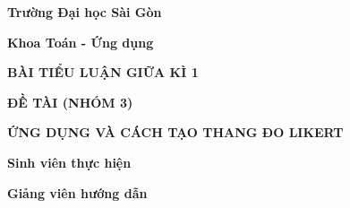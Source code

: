 \documentclass[12pt]{article}
\begin{document}
\setlength{\parindent}{10pt}
\begin{titlepage}

    \begin{center}
    
    \textbf{\Large Trường Đại học Sài Gòn}
    
    \textbf{\Large Khoa Toán - Ứng dụng}
        
    \end{center}
    
    \vspace{2cm}
    
    \begin{center}
    
    \textbf{\huge BÀI TIỂU LUẬN GIỮA KÌ 1}
    
    \end{center}
    
    \vspace{1cm}
    
    \begin{center}
    
    \textbf{\huge ĐỀ TÀI (NHÓM 3)}

    \vspace{.5cm}
    
    \textbf{\huge ỨNG DỤNG VÀ CÁCH TẠO
    THANG ĐO LIKERT}
    
    \end{center}
    
    \vspace{1cm}
    
    \begin{center}
    
    \textbf{\Large Sinh viên thực hiện}
    
    \vspace{.5cm}

    
    \vspace{.4cm}

    
    \end{center}
    
    \vspace{1cm}
    
    \begin{center}
    
    \textbf{\Large Giảng viên hướng dẫn}
    
    \vspace{.5cm}

    
    \end{center}
    
    \vspace{1cm}
    
    \begin{center}
    
    
    \end{center}
    
    \end{titlepage}
\end{document}
